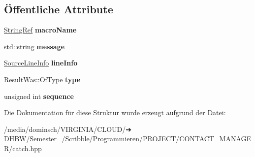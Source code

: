 \subsection*{Öffentliche Attribute}
\begin{DoxyCompactItemize}
\item 
\mbox{\label{structCatch_1_1MessageInfo_a3ee7cd41def0989d2193bad7101436a0}} 
\hyperlink{classCatch_1_1StringRef}{String\+Ref} {\bfseries macro\+Name}
\item 
\mbox{\label{structCatch_1_1MessageInfo_ab6cd06e050bf426c6577502a5c50e256}} 
std\+::string {\bfseries message}
\item 
\mbox{\label{structCatch_1_1MessageInfo_a985165328723e599696ebd8e43195cc5}} 
\hyperlink{structCatch_1_1SourceLineInfo}{Source\+Line\+Info} {\bfseries line\+Info}
\item 
\mbox{\label{structCatch_1_1MessageInfo_ae928b9117465c696e45951d9d0284e78}} 
Result\+Was\+::\+Of\+Type {\bfseries type}
\item 
\mbox{\label{structCatch_1_1MessageInfo_a7f4f57ea21e50160adefce7b68a781d6}} 
unsigned int {\bfseries sequence}
\end{DoxyCompactItemize}


Die Dokumentation für diese Struktur wurde erzeugt aufgrund der Datei\+:\begin{DoxyCompactItemize}
\item 
/media/dominsch/\+V\+I\+R\+G\+I\+N\+I\+A/\+C\+L\+O\+U\+D/➔ D\+H\+B\+W/\+Semester\+\_/\+Scribble/\+Programmieren/\+P\+R\+O\+J\+E\+C\+T/\+C\+O\+N\+T\+A\+C\+T\+\_\+\+M\+A\+N\+A\+G\+E\+R/catch.\+hpp\end{DoxyCompactItemize}
